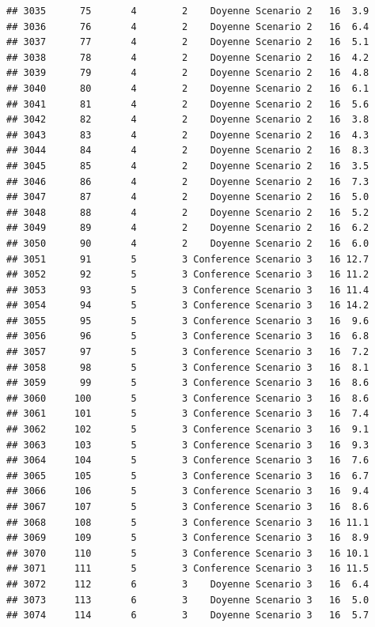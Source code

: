 \documentclass[
]{article}
\begin{document}
\begin{verbatim}
## 3035      75       4        2    Doyenne Scenario 2   16  3.9
## 3036      76       4        2    Doyenne Scenario 2   16  6.4
## 3037      77       4        2    Doyenne Scenario 2   16  5.1
## 3038      78       4        2    Doyenne Scenario 2   16  4.2
## 3039      79       4        2    Doyenne Scenario 2   16  4.8
## 3040      80       4        2    Doyenne Scenario 2   16  6.1
## 3041      81       4        2    Doyenne Scenario 2   16  5.6
## 3042      82       4        2    Doyenne Scenario 2   16  3.8
## 3043      83       4        2    Doyenne Scenario 2   16  4.3
## 3044      84       4        2    Doyenne Scenario 2   16  8.3
## 3045      85       4        2    Doyenne Scenario 2   16  3.5
## 3046      86       4        2    Doyenne Scenario 2   16  7.3
## 3047      87       4        2    Doyenne Scenario 2   16  5.0
## 3048      88       4        2    Doyenne Scenario 2   16  5.2
## 3049      89       4        2    Doyenne Scenario 2   16  6.2
## 3050      90       4        2    Doyenne Scenario 2   16  6.0
## 3051      91       5        3 Conference Scenario 3   16 12.7
## 3052      92       5        3 Conference Scenario 3   16 11.2
## 3053      93       5        3 Conference Scenario 3   16 11.4
## 3054      94       5        3 Conference Scenario 3   16 14.2
## 3055      95       5        3 Conference Scenario 3   16  9.6
## 3056      96       5        3 Conference Scenario 3   16  6.8
## 3057      97       5        3 Conference Scenario 3   16  7.2
## 3058      98       5        3 Conference Scenario 3   16  8.1
## 3059      99       5        3 Conference Scenario 3   16  8.6
## 3060     100       5        3 Conference Scenario 3   16  8.6
## 3061     101       5        3 Conference Scenario 3   16  7.4
## 3062     102       5        3 Conference Scenario 3   16  9.1
## 3063     103       5        3 Conference Scenario 3   16  9.3
## 3064     104       5        3 Conference Scenario 3   16  7.6
## 3065     105       5        3 Conference Scenario 3   16  6.7
## 3066     106       5        3 Conference Scenario 3   16  9.4
## 3067     107       5        3 Conference Scenario 3   16  8.6
## 3068     108       5        3 Conference Scenario 3   16 11.1
## 3069     109       5        3 Conference Scenario 3   16  8.9
## 3070     110       5        3 Conference Scenario 3   16 10.1
## 3071     111       5        3 Conference Scenario 3   16 11.5
## 3072     112       6        3    Doyenne Scenario 3   16  6.4
## 3073     113       6        3    Doyenne Scenario 3   16  5.0
## 3074     114       6        3    Doyenne Scenario 3   16  5.7

\end{verbatim}
\end{document}
